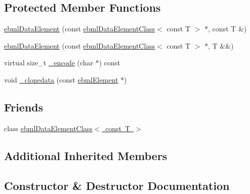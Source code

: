 \subsection*{Protected Member Functions}
\begin{DoxyCompactItemize}
\item 
\mbox{\hyperlink{classebml_1_1ebmlDataElement_3_01const_01T_01_4_abb559dd529796adda5e2ea9b8bedf876}{ebml\+Data\+Element}} (const \mbox{\hyperlink{classebml_1_1ebmlDataElementClass}{ebml\+Data\+Element\+Class}}$<$ const T $>$ $\ast$, const T \&)
\item 
\mbox{\hyperlink{classebml_1_1ebmlDataElement_3_01const_01T_01_4_aafdd5fd8f53e58c34891419df8fd196f}{ebml\+Data\+Element}} (const \mbox{\hyperlink{classebml_1_1ebmlDataElementClass}{ebml\+Data\+Element\+Class}}$<$ const T $>$ $\ast$, T \&\&)
\item 
virtual size\+\_\+t \mbox{\hyperlink{classebml_1_1ebmlDataElement_3_01const_01T_01_4_aac802a573eaeaa5b856d5e74deb9dd3a}{\+\_\+encode}} (char $\ast$) const
\item 
void \mbox{\hyperlink{classebml_1_1ebmlDataElement_3_01const_01T_01_4_a46a152b21a6fc49a331e61f29c486ebe}{\+\_\+clonedata}} (const \mbox{\hyperlink{classebml_1_1ebmlElement}{ebml\+Element}} $\ast$)
\end{DoxyCompactItemize}
\subsection*{Friends}
\begin{DoxyCompactItemize}
\item 
class \mbox{\hyperlink{classebml_1_1ebmlDataElement_3_01const_01T_01_4_aea1d7162edf00e39cf37b106860abbcd}{ebml\+Data\+Element\+Class$<$ const T $>$}}
\end{DoxyCompactItemize}
\subsection*{Additional Inherited Members}


\subsection{Constructor \& Destructor Documentation}
\mbox{\label{classebml_1_1ebmlDataElement_3_01const_01T_01_4_abb559dd529796adda5e2ea9b8bedf876}} 
